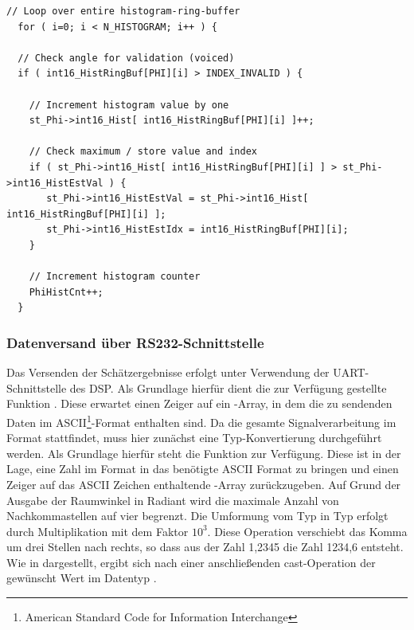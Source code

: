 \begin{lstlisting}[caption={Histogrammerstellung für den Raumwinkel $\phi$}, label=lst:histogramm,frame=htlrb, firstnumber=1]
  // Loop over entire histogram-ring-buffer
  for ( i=0; i < N_HISTOGRAM; i++ ) {

  // Check angle for validation (voiced)
  if ( int16_HistRingBuf[PHI][i] > INDEX_INVALID ) {

    // Increment histogram value by one
    st_Phi->int16_Hist[ int16_HistRingBuf[PHI][i] ]++;

    // Check maximum / store value and index
    if ( st_Phi->int16_Hist[ int16_HistRingBuf[PHI][i] ] > st_Phi->int16_HistEstVal ) {
       st_Phi->int16_HistEstVal = st_Phi->int16_Hist[ int16_HistRingBuf[PHI][i] ];
       st_Phi->int16_HistEstIdx = int16_HistRingBuf[PHI][i];
    }

    // Increment histogram counter
    PhiHistCnt++;
  }
\end{lstlisting}





\subsubsection{Datenversand über RS232-Schnittstelle}
Das Versenden der Schätzergebnisse erfolgt unter Verwendung der UART-Schnittstelle des DSP. Als Grundlage hierfür dient die zur Verfügung gestellte Funktion . Diese erwartet einen Zeiger auf ein -Array, in dem die zu sendenden Daten im ASCII\footnote{American Standard Code for Information Interchange}-Format enthalten sind. Da die gesamte Signalverarbeitung im Format  stattfindet,  muss hier zunächst eine Typ-Konvertierung durchgeführt werden. Als Grundlage hierfür steht die Funktion  zur Verfügung. Diese ist in der Lage, eine Zahl im Format  in das benötigte ASCII Format zu bringen und einen Zeiger auf das ASCII Zeichen enthaltende -Array zurückzugeben. Auf Grund der Ausgabe der Raumwinkel in Radiant wird die maximale Anzahl von Nachkommastellen auf vier begrenzt. Die Umformung vom Typ  in Typ  erfolgt durch Multiplikation mit dem Faktor $10^3$. Diese Operation verschiebt das Komma um drei Stellen nach rechts, so dass aus der Zahl 1,2345 die Zahl 1234,6 entsteht. Wie in  dargestellt, ergibt sich nach einer anschließenden cast-Operation der gewünscht Wert im Datentyp . 


